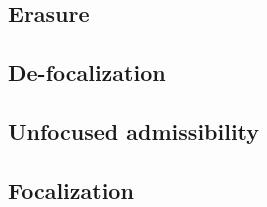\subsection{Erasure}

\subsection{De-focalization}

\subsection{Unfocused admissibility}

\subsection{Focalization}


